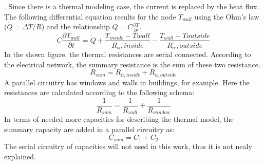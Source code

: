     \cite{Kuchling.2007}. 
    Since there is a thermal modeling case, the current is replaced by the heat flux. The following differential equation results for the node  $T_{wall}$ using the Ohm's law ($\dot{Q}=\Delta T/R$) and the relationship $\dot{Q}=C\frac{\partial T}{\partial t}$.     
    \begin{equation}
    \label{eq:sampledifferential}
    C \frac{\partial T_{wall}}{\partial t} = \dot{Q} + \frac{T_{inside}-T{wall}}{R_\alpha,inside} - \frac{T_{wall}-T{outside}}{R_\alpha,outside}
    \end{equation}
    In the shown figure, the thermal resistances are serial connected. According to the electrical network, the summary resistance is the sum of these two resistance. 
    \begin{equation}
    \label{eq:resistanceseriel}
        R_{sum} = R_{\alpha,inside} + R_{\alpha,outside}
    \end{equation}
    A parallel circuitry has windows and walls in buildings, for example. Here the resistances are calculated according to the following schema:
    \begin{equation}
    \label{eq:resistancesparallel}
        \frac{1}{R_{sum}} = \frac{1}{R_{wall}} + \frac{1}{R_{window}}
    \end{equation}
    In terms of needed more capacities for describing the thermal model, the summary capacity are added in a parallel circuitry as: 
    \begin{equation}
    \label{eq:capacity}
         C_{sum} = C_1 + C_2
    \end{equation}
    The serial circuitry of capacities will not used in this work, thus it is not nealy explained.
